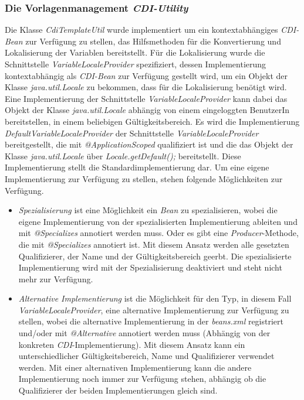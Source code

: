 \subsubsection{Die Vorlagenmanagement \emph{CDI-Utility}}
Die Klasse \emph{CdiTemplateUtil} wurde implementiert um ein kontextabhängiges \emph{CDI-Bean} zur Verfügung zu stellen, das Hilfsmethoden für die Konvertierung und Lokalisierung der Variablen bereitstellt. Für die Lokalisierung wurde die Schnittstelle \emph{VariableLocaleProvider} spezifiziert, dessen Implementierung kontextabhängig als \emph{CDI-Bean} zur Verfügung gestellt wird, um ein Objekt der Klasse \emph{java.util.Locale} zu bekommen, dass für die Lokalisierung benötigt wird. Eine Implementierung der Schnittstelle \emph{VariableLocaleProvider} kann dabei das Objekt der Klasse \emph{java.util.Locale} abhängig von einem eingeloggten BenutzerIn bereitstellen, in einem beliebigen Gültigkeitsbereich.
\newline
\newline
Es wird die Implementierung \emph{DefaultVariableLocaleProvider} der Schnittstelle \emph{VariableLocaleProvider} bereitgestellt, die mit \emph{@ApplicationScoped} qualifiziert ist und die das Objekt der Klasse \emph{java.util.Locale} über \emph{Locale.getDefault();} bereitstellt. Diese Implementierung stellt die Standardimplementierung dar. Um eine eigene Implementierung zur Verfügung zu stellen, stehen folgende Möglichkeiten zur Verfügung.
\begin{itemize}
	\item\emph{Spezialisierung} ist eine Möglichkeit ein \emph{Bean} zu spezialisieren, wobei die eigene Implementierung von der spezialisierten Implementierung ableiten und mit \emph{@Specializes} annotiert werden muss. Oder es gibt eine \emph{Producer}-Methode, die mit \emph{@Specializes} annotiert ist. Mit diesem Ansatz werden alle gesetzten Qualifizierer, der Name und der Gültigkeitsbereich geerbt. Die spezialisierte Implementierung wird mit der Spezialisierung deaktiviert und steht nicht mehr zur Verfügung.
	\item\emph{Alternative Implementierung} ist die Möglichkeit für den Typ, in diesem Fall \emph{VariableLocaleProvider}, eine alternative Implementierung zur Verfügung zu stellen, wobei die alternative Implementierung in der \emph{beans.xml} registriert und/oder mit \emph{@Alternative} annotiert werden muss (Abhängig von der konkreten \emph{CDI}-Implementierung). Mit diesem Ansatz kann ein unterschiedlicher Gültigkeitsbereich, Name und Qualifizierer verwendet werden. Mit einer alternativen Implementierung kann die andere Implementierung noch immer zur Verfügung stehen, abhängig ob die Qualifizierer der beiden Implementierungen gleich sind.
\end{itemize}

